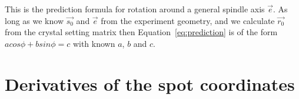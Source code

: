 \documentclass{article}
\begin{document}
This is the prediction formula for rotation around a general spindle axis $\vec{e}$. As long as we know $\vec{s_0}$ and $\vec{e}$
from the experiment geometry, and we calculate $\vec{r_0}$ from the crystal setting matrix then Equation~\ref{eq:prediction} is of
the form $a cos{\phi} + b sin{\phi} = c$ with known $a$, $b$ and $c$.

\section*{Derivatives of the spot coordinates}
\end{document}
